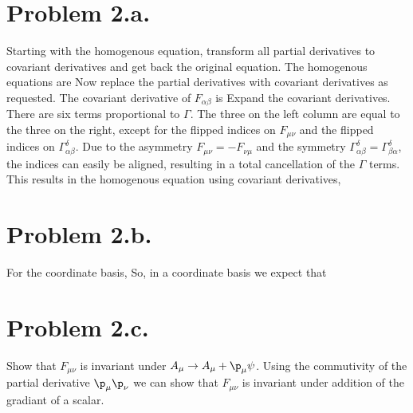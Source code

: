 \documentclass{article}
\begin{document}
\section*{Problem 2.a.}
Starting with the homogenous equation, transform all partial derivatives to covariant derivatives and get back the original equation. The homogenous equations are
Now replace the partial derivatives with covariant derivatives as requested.
The covariant derivative of $F_{\alpha\beta}$ is
Expand the covariant derivatives.
There are six terms proportional to $\Gamma$. The three on the left column are equal to the three on the right, except for the flipped indices on $F_{\mu\nu}$ and the flipped indices on $\Gamma^\delta_{\alpha \beta}$. Due to the asymmetry $F_{\mu\nu}=-F_{\nu\mu}$ and the symmetry $\Gamma^\delta_{\alpha \beta}=\Gamma^\delta_{\beta \alpha}$, the indices can easily be aligned, resulting in a total cancellation of the $\Gamma$ terms. This results in the homogenous equation using covariant derivatives,
\section*{Problem 2.b.}
For the coordinate basis,
So, in a coordinate basis we expect that 
\section*{Problem 2.c.}
Show that $F_{\mu\nu}$ is invariant under $A_\mu \rightarrow A_\mu+\p_\mu \psi$.
Using the commutivity of the partial derivative $\p_\mu \p_\nu$ we can show that $F_{\mu\nu}$ is invariant under addition of the gradiant of a scalar.
\end{document}
